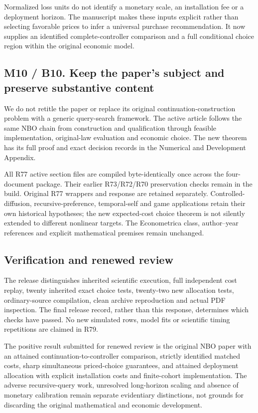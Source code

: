 Normalized loss units do not identify a monetary scale, an installation
fee or a deployment horizon. The manuscript makes these inputs explicit
rather than selecting favorable prices to infer a universal purchase
recommendation. It now supplies an identified complete-controller
comparison and a full conditional choice region within the original
economic model.

\hypertarget{m10-b10.-keep-the-papers-subject-and-preserve-substantive-content}{%
\subsection{M10 / B10. Keep the paper's subject and preserve substantive
content}\label{m10-b10.-keep-the-papers-subject-and-preserve-substantive-content}}

We do not retitle the paper or replace its original
continuation-construction problem with a generic query-search framework.
The active article follows the same NBO chain from construction and
qualification through feasible implementation, original-law evaluation
and economic choice. The new theorem has its full proof and exact
decision records in the Numerical and Development Appendix.

All R77 active section files are compiled byte-identically once across
the four-document package. Their earlier R73/R72/R70 preservation checks
remain in the build. Original R77 wrappers and response are retained
separately. Controlled-diffusion, recursive-preference, temporal-self
and game applications retain their own historical hypotheses; the new
expected-cost choice theorem is not silently extended to different
nonlinear targets. The Econometrica class, author--year references and
explicit mathematical premises remain unchanged.

\hypertarget{verification-and-renewed-review}{%
\subsection{Verification and renewed
review}\label{verification-and-renewed-review}}

The release distinguishes inherited scientific execution, full
independent cost replay, twenty inherited exact choice tests, twenty-two
new allocation tests, ordinary-source compilation, clean archive
reproduction and actual PDF inspection. The final release record, rather
than this response, determines which checks have passed. No new
simulated rows, model fits or scientific timing repetitions are claimed
in R79.

The positive result submitted for renewed review is the original NBO
paper with an attained continuation-to-controller comparison, strictly
identified matched costs, sharp simultaneous priced-choice guarantees,
and attained deployment allocation with explicit installation costs and
finite-cohort implementation. The adverse recursive-query work,
unresolved long-horizon scaling and absence of monetary calibration
remain separate evidentiary distinctions, not grounds for discarding the
original mathematical and economic development.
